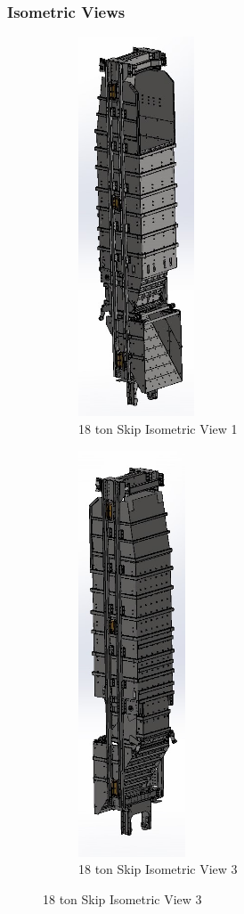 \documentclass{article}%
\begin{document}
%
\newpage%
\subsubsection{Isometric Views}%
\label{ssubsec:IsometricViews}%


\begin{figure}[h!]%
\begin{subfigure}[b]{0.45\linewidth}%
\includegraphics[width=130px]{Tumela 18 ton Skip_iso_1.jpg}%
\centering%
\caption{18 ton Skip Isometric View 1}%
\end{subfigure}%
\begin{subfigure}[b]{0.45\linewidth}%
\includegraphics[width=120px]{Tumela 18 ton Skip_iso_3.jpg}%
\centering%
\caption{18 ton Skip Isometric View 3}%
\end{subfigure}%
\end{figure}
\end{document}
